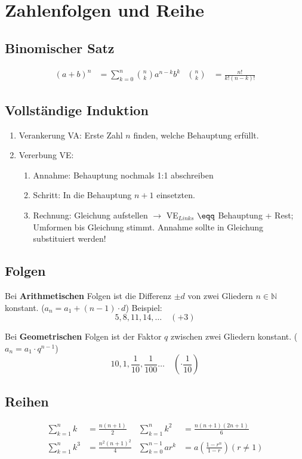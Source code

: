 \section{Zahlenfolgen und Reihe}

\subsection{Binomischer Satz }
\begin{align*}
	(a+b)^n &= \sum_{k=0}^n \binom{n}{k} a^{n-k} b^k
	&
	\binom{n}{k} &= \frac{n!}{k!(n-k)!}
\end{align*}

\subsection{Vollständige Induktion}\label{induktion}
\begin{enumerate}[nosep]
	\item Verankerung VA: Erste Zahl $n$ finden, welche Behauptung erfüllt.
	\item Vererbung VE:
	\begin{enumerate}
		\item Annahme: Behauptung nochmals 1:1 abschreiben
		\item Schritt: In die Behauptung $n+1$ einsetzten.
		\item Rechnung: Gleichung aufstellen $\rightarrow$ VE$_{Links}$ $\eqq$ Behauptung + Rest; Umformen bis Gleichung stimmt. Annahme sollte in Gleichung substituiert werden!
	\end{enumerate}

\end{enumerate}

\subsection{Folgen}
\noindent Bei \textbf{Arithmetischen} Folgen ist die Differenz $\pm d$ von zwei Gliedern $n \in \mathbb{N}$ konstant. ($a_n = a_1 + (n - 1) \cdot d$) Beispiel:
\[5,8,11,14,\dots \quad (+3)\]

\noindent Bei \textbf{Geometrischen} Folgen ist der Faktor $q$ zwischen zwei Gliedern konstant. ($a_n = a_1 \cdot q^{n-1}$)
\[10, 1, \frac{1}{10}, \frac{1}{100}\dots \quad (\cdot \frac{1}{10})\]


\subsection{Reihen }
\begin{align*}
	\sum_{k=1}^n k   &= \frac{n(n+1)}{2} &
	\sum_{k=1}^n k^2 &= \frac{n(n+1)(2n+1)}{6} \\
	\sum_{k=1}^n k^3 &= \frac{n^2(n+1)^2}{4} &
	\sum_{k=0}^{n-1} ar^k &= a\left(\frac{1-r^n}{1-r}\right) (r \neq 1)
\end{align*}
